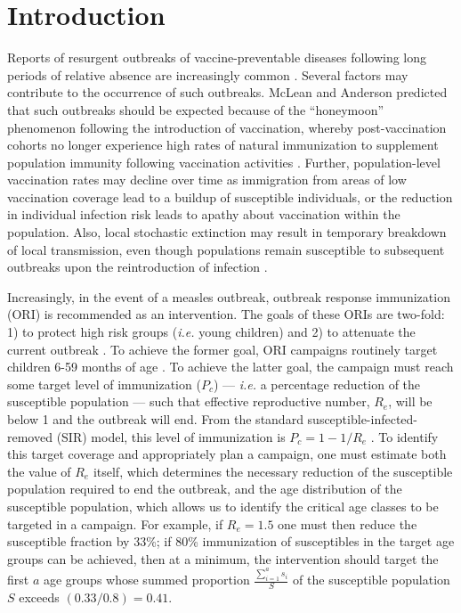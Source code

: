 \section{Introduction}\label{introduction}

Reports of resurgent outbreaks of vaccine-preventable diseases following long periods of relative absence are  increasingly common \cite{Hersh_1991, Cherry_2012, Celentano_2005, Shibeshi_2014}. Several factors may contribute to the occurrence of such outbreaks. McLean and Anderson \cite{McLean_1988} predicted that such outbreaks should be expected because of the ``honeymoon'' phenomenon following the introduction of vaccination, whereby post-vaccination cohorts no longer experience high rates of natural immunization to supplement population immunity following vaccination activities \cite{Jansen_2003}. Further, population-level vaccination rates may decline over time as immigration from areas of low vaccination coverage lead to a buildup of susceptible individuals, or the reduction in individual infection risk \cite{Omer_2009} leads to apathy about vaccination within the population. Also, local stochastic extinction may result in temporary breakdown of local transmission, even though populations remain susceptible to subsequent outbreaks upon the reintroduction of infection \cite{Ferrari_2008}.

Increasingly, in the event of a measles outbreak, outbreak response immunization (ORI) is recommended as an intervention. The goals of these ORIs are two-fold: 1) to protect high risk groups (\emph{i.e.} young children) and 2) to attenuate the current outbreak \cite{Cairns_2011,Grais_2011}. To achieve the former goal, ORI campaigns routinely target children 6-59 months of age \cite{Cairns_2011}. To achieve the latter goal, the campaign must reach some target level of immunization (\(P_c\)) --- \emph{i.e.} a percentage reduction of the susceptible population --- such that effective reproductive number, \(R_e\), will be below 1 and the outbreak will end. From the standard susceptible-infected-removed (SIR) model, this level of immunization is \(P_c = 1-1/R_e\) \cite{Anderson_1981}. To identify this target coverage and appropriately plan a campaign, one must estimate both the value of \(R_e\) itself, which determines the necessary reduction of the susceptible population required to end the outbreak, and the age distribution of the susceptible population, which allows us to identify the critical age classes to be targeted in a campaign. For example, if \(R_e=1.5\) one must then reduce the susceptible fraction by 33\%; if 80\% immunization of susceptibles in the target age groups can be achieved, then at a minimum, the intervention should target the first $a$ age groups whose summed proportion $\frac{\sum_{i=1}^a s_i}{S}$ of the susceptible population $S$ exceeds $(0.33/0.8) = 0.41$.

